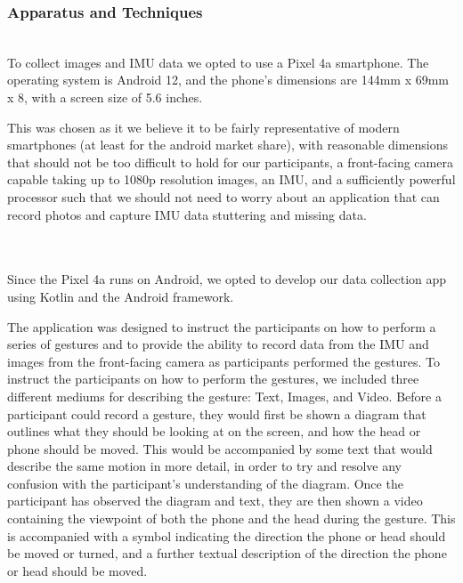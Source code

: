 \subsubsection{Apparatus and Techniques}\nl %
\\
To collect images and IMU data we opted to use a Pixel 4a smartphone.
The operating system is Android 12, and the phone's dimensions are 144mm x 69mm x 8, with a screen size of 5.6 inches.

This was chosen as it we believe it to be fairly representative of modern smartphones (at least for the android market share), with reasonable dimensions that should not be too difficult to hold for our participants, a front-facing camera capable taking up to 1080p resolution images, an IMU, and a sufficiently powerful processor such that we should not need to worry about an application that can record photos and capture IMU data stuttering and missing data.

\nl{}\\
\\
Since the Pixel 4a runs on Android, we opted to develop our data collection app using Kotlin and the Android framework.

The application was designed to instruct the participants on how to perform a series of gestures and to provide the ability to record data from the IMU and images from the front-facing camera as participants performed the gestures.
To instruct the participants on how to perform the gestures, we included three different mediums for describing the gesture: Text, Images, and Video.
Before a participant could record a gesture, they would first be shown a diagram that outlines what they should be looking at on the screen, and how the head or phone should be moved. This would be accompanied by some text that would describe the same motion in more detail, in order to try and resolve any confusion with the participant's understanding of the diagram.
Once the participant has observed the diagram and text, they are then shown a video containing the viewpoint of both the phone and the head during the gesture. This is accompanied with a symbol indicating the direction the phone or head should be moved or turned, and a further textual description of the direction the phone or head should be moved.


